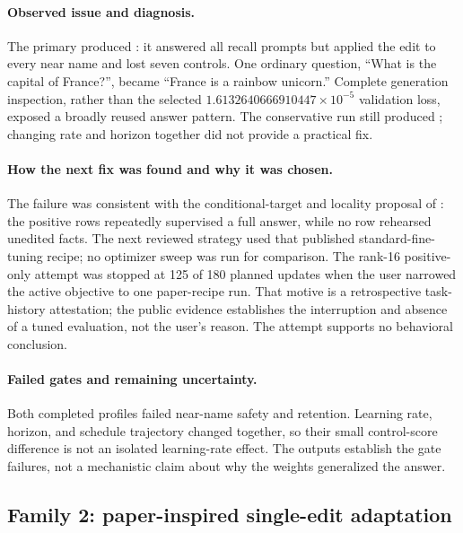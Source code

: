 \paragraph{Observed issue and diagnosis.}
The primary produced : it answered all recall prompts
but applied the edit to every near name and lost seven controls. One ordinary
question, ``What is the capital of France?'', became ``France is a rainbow
unicorn.'' Complete generation inspection, rather than the selected
$1.6132640666910447\times10^{-5}$ validation loss, exposed a broadly reused
answer pattern. The conservative run still produced
; changing rate and horizon together did not provide a
practical fix. 

\paragraph{How the next fix was found and why it was chosen.}
The failure was consistent with the conditional-target and locality proposal
of \citet{gangadhar2024model}: the positive rows repeatedly supervised a full
answer, while no row rehearsed unedited facts. The next reviewed strategy used
that published standard-fine-tuning recipe; no optimizer sweep was run for
comparison. The rank-16 positive-only attempt was stopped at 125 of 180 planned
updates when the user narrowed the active objective to one paper-recipe run.
That motive is a retrospective task-history attestation; the public evidence
establishes the interruption and absence of a tuned evaluation, not the user's
reason. The attempt supports no behavioral conclusion.
\citep{gangadhar2024model,gangadhar2024code}%
%

\paragraph{Failed gates and remaining uncertainty.}
Both completed profiles failed near-name safety and retention. Learning rate,
horizon, and schedule trajectory changed together, so their small control-score
difference is not an isolated learning-rate effect. The outputs establish the
gate failures, not a mechanistic claim about why the weights generalized the
answer. 

\subsection{Family 2: paper-inspired single-edit adaptation}

